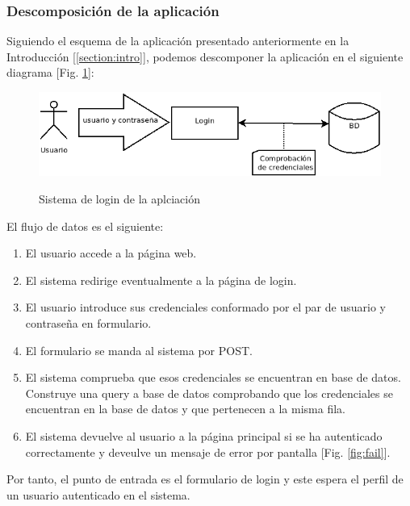 \documentclass[a4paper,oneside]{article}
\begin{document}
\subsubsection{Descomposición de la aplicación}
Siguiendo el esquema de la aplicación presentado anteriormente en la Introducción [\ref{section:intro}], podemos descomponer la aplicación en el siguiente diagrama [Fig. \ref{fig:login2}]:

\begin{figure}[h!]
  \centering
  \includegraphics[scale=0.6]{images/login2.png}\\
  \caption{Sistema de login de la aplciación}
  \label{fig:login2}
\end{figure}

El flujo de datos es el siguiente:
\begin{enumerate}
\item El usuario accede a la página web.
\item El sistema redirige eventualmente a la página de login.
\item El usuario introduce sus credenciales conformado por el par de usuario y contraseña en formulario.
\item El formulario se manda al sistema por POST.
\item El sistema comprueba que esos credenciales se encuentran en base de datos. Construye una query a base de datos comprobando que los credenciales se encuentran en la base de datos y que pertenecen a la misma fila.
\item El sistema devuelve al usuario a la página principal si se ha autenticado correctamente y deveulve un mensaje de error por pantalla [Fig. \ref{fig:fail}].
\end{enumerate}

Por tanto, el punto de entrada es el formulario de login y este espera el perfil de un usuario autenticado en el sistema.
\end{document}
